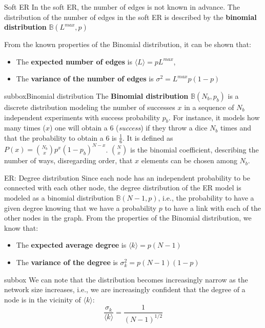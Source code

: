 \begin{textbox}{Soft ER}
    In the soft ER, the number of edges is not known in advance. The distribution of the number of edges in the soft ER is described by the \textbf{binomial distribution} $\mathbb{B}(L^{max},p)$

    From the known properties of the Binomial distribution, it can be shown that:
    \begin{itemize}
        \item The \textbf{expected number of edges} is $\langle L \rangle = p L^{max}$,

        \item The \textbf{variance of the number of edges} is $\sigma^2 = L^{max}p(1-p)$
    \end{itemize}
\end{textbox}


\begin{subbox}{subbox}{Binomial distribution}
    The \textbf{Binomial distribution} $\mathbb{B}(N_b,p_b)$ is a discrete distribution modeling the number of successes $x$ in a sequence of $N_b$ independent experiments with success probability $p_b$. For instance, it models how many times ($x$) one will obtain a 6 (\textit{success}) if they throw a dice $N_b$ times and that the probability to obtain a 6 is $\frac{1}{6}$. It is defined as $P(x)=\binom{N_b}{x}p^x(1-p_b)^{N-x}$. $\binom{N}{x}$ is the binomial coefficient, describing the number of ways, disregarding order, that $x$ elements can be chosen among $N_b$.
\end{subbox}


\begin{textbox}{ER: Degree distribution}
    Since each node has an independent probability to be connected with each other node, the degree distribution of the ER model is modeled as a binomial distribution $\mathbb{B} (N-1 , p)$, i.e., the probability to have a given degree knowing that we have a probability $p$ to have a link with each of the other nodes in the graph. From the properties of the Binomial distribution, we know that:
    \begin{itemize}
        \item The \textbf{expected average degree} is $\langle k \rangle=p(N-1)$
        \item The \textbf{variance of the degree} is $\sigma^2_k =p(N-1)(1-p)$
    \end{itemize}

    \begin{subbox}{subbox}{}
        We can note that the distribution becomes increasingly narrow as the network size increases, i.e., we are increasingly confident that the degree of a node is in the vicinity of $\langle k \rangle$:
        \[
            \frac{\sigma_k}{\langle k \rangle}=\frac{1}{(N-1)^{1/2}}
        \]
    \end{subbox}
\end{textbox}


